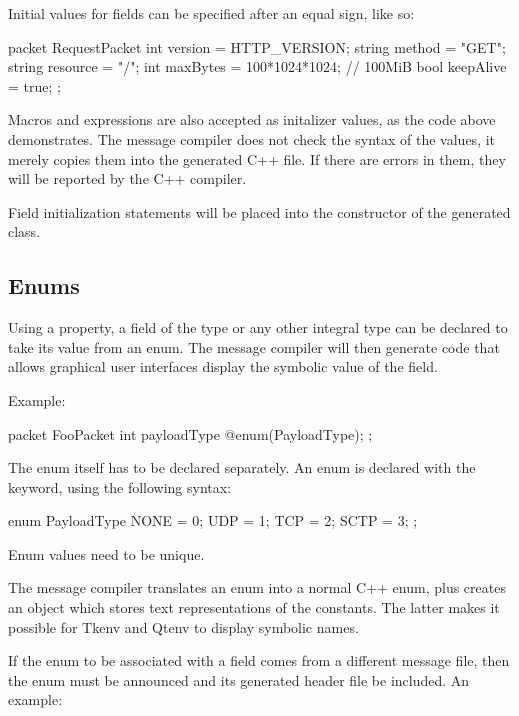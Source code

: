 Initial values for fields can be specified after an equal sign, like so:

\begin{msg}
packet RequestPacket
{
    int version = HTTP_VERSION;
    string method = "GET";
    string resource = "/";
    int maxBytes = 100*1024*1024; // 100MiB
    bool keepAlive = true;
};
\end{msg}

Macros and expressions are also accepted as initalizer values, as the code
above demonstrates. The message compiler does not check the syntax of the
values, it merely copies them into the generated C++ file. If there are
errors in them, they will be reported by the C++ compiler.

Field initialization statements will be placed into the constructor of the
generated class.


\subsection{Enums}
\label{sec:msg-defs:enums}

Using a  property, a field of the type  or any
other integral type can be declared to take its value from an enum. The
message compiler will then generate code that allows graphical user
interfaces display the symbolic value of the field.

Example:

\begin{msg}
packet FooPacket
{
    int payloadType @enum(PayloadType);
};
\end{msg}

The enum itself has to be declared separately. An enum is declared with
the  keyword, using the following syntax:

\begin{msg}
enum PayloadType
{
   NONE = 0;
   UDP = 1;
   TCP = 2;
   SCTP = 3;
};
\end{msg}

Enum values need to be unique.

The message compiler translates an enum into a normal C++ enum, plus
creates an object which stores text representations of the constants. The
latter makes it possible for Tkenv and Qtenv to display symbolic names.

If the enum to be associated with a field comes from a different message file,
then the enum must be announced and its generated header file be included.
An example:

